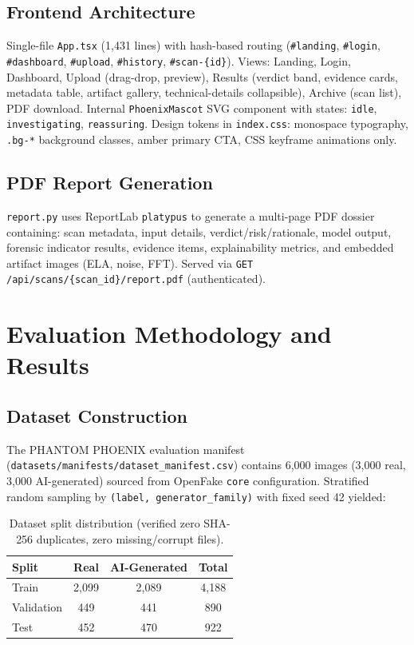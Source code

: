 \documentclass[10pt,conference,compsoc]{IEEEtran}
\begin{document}
\subsection{Frontend Architecture}
\label{sec:frontend}

Single-file \texttt{App.tsx} (1,431 lines) with hash-based routing (\texttt{\#landing}, \texttt{\#login}, \texttt{\#dashboard}, \texttt{\#upload}, \texttt{\#history}, \texttt{\#scan-\{id\}}).
Views: Landing, Login, Dashboard, Upload (drag-drop, preview), Results (verdict band, evidence cards, metadata table, artifact gallery, technical-details collapsible), Archive (scan list), PDF download.
Internal \texttt{PhoenixMascot} SVG component with states: \texttt{idle}, \texttt{investigating}, \texttt{reassuring}.
Design tokens in \texttt{index.css}: monospace typography, \texttt{.bg-*} background classes, amber primary CTA, CSS keyframe animations only.

\subsection{PDF Report Generation}
\label{sec:pdf}

\texttt{report.py} uses ReportLab \texttt{platypus} to generate a multi-page PDF dossier containing:
scan metadata, input details, verdict/risk/rationale, model output, forensic indicator results, evidence items, explainability metrics, and embedded artifact images (ELA, noise, FFT).
Served via \texttt{GET /api/scans/\{scan\_id\}/report.pdf} (authenticated).

\section{Evaluation Methodology and Results}
\label{sec:evaluation}

\subsection{Dataset Construction}
\label{sec:dataset}

The PHANTOM PHOENIX evaluation manifest (\texttt{datasets/manifests/dataset\_manifest.csv}) contains 6,000 images (3,000 real, 3,000 AI-generated) sourced from OpenFake \texttt{core} configuration.
Stratified random sampling by \texttt{(label, generator\_family)} with fixed seed 42 yielded:

\begin{table}[t]
\caption{Dataset split distribution (verified zero SHA-256 duplicates, zero missing/corrupt files).}
\label{tab:splits}
\centering
\begin{tabular}{lccc}
\toprule
Split & Real & AI-Generated & Total \\
\midrule
Train & 2,099 & 2,089 & 4,188 \\
Validation & 449 & 441 & 890 \\
Test & 452 & 470 & 922 \\
\bottomrule
\end{tabular}
\end{table}
\end{document}
